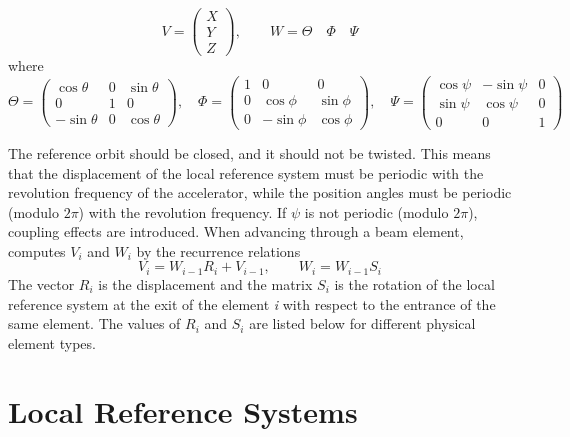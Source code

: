 \begin{equation}
V =
 \begin{pmatrix}
  X \\
  Y \\
  Z
 \end{pmatrix}
, \qquad
W=\Theta \quad \Phi \quad \Psi
\end{equation}
 where 
\begin{equation}
\Theta =
 \begin{pmatrix}
  \cos \theta  & 0 &  \sin \theta \\
  0            & 1 &  0 \\
  -\sin \theta & 0 &  \cos \theta
 \end{pmatrix}
, \quad
\Phi =
 \begin{pmatrix}
  1 & 0          &  0 \\
  0 & \cos \phi  &  \sin \phi \\
  0 & -\sin \phi &  \cos \phi
 \end{pmatrix}
, \quad
\Psi =
 \begin{pmatrix}
  \cos \psi &  -\sin \psi & 0 \\
  \sin \psi &  \cos \psi  & 0 \\
  0	    &	0	  & 1 
 \end{pmatrix}
\end{equation}

The reference orbit should be closed, and it should not be twisted. 
This means that the displacement of the local reference system must be
periodic with the revolution frequency of the accelerator, while the
position angles must be periodic (modulo $2\pi$) with the revolution
frequency. If $\psi$ is not periodic (modulo $2\pi$), coupling effects are
introduced. 
When advancing through a beam element, \madx computes
$V_i$ and $W_i$ by the recurrence relations  
\begin{equation}
   V_i=W_{i-1}R_i+V_{i-1},
   \qquad
   W_i=W_{i-1}S_i
\end{equation}
The vector $R_i$ is the displacement and the matrix
$S_i$ is the rotation of the local reference system  at the
exit of the element \textit{i} with respect to the entrance  of the same
element. The values of $R_i$ and $S_i$ are listed below
for different physical element types.  


\section{Local Reference Systems}
\label{sec:local_ref}

